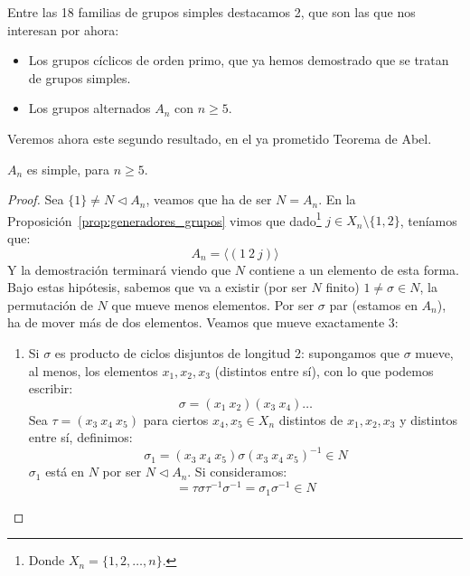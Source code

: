 \noindent
Entre las 18 familias de grupos simples destacamos 2, que son las que nos interesan por ahora: 
\begin{itemize}
    \item Los grupos cíclicos de orden primo, que ya hemos demostrado que se tratan de grupos simples.
    \item Los grupos alternados $A_n$ con $n\geq 5$.
\end{itemize}
Veremos ahora este segundo resultado, en el ya prometido Teorema de Abel.

\begin{teo}[de Abel]
    $A_n$ es simple, para $n\geq 5$.
    \begin{proof} 
        Sea $\{1\} \neq N \lhd A_n$, veamos que ha de ser $N = A_n$. En la Proposición~\ref{prop:generadores_grupos} vimos que dado\footnote{Donde $X_n = \{1,2,\ldots,n\}.$} $j \in X_n\setminus \{1,2\}$, teníamos que:
        \begin{equation*}
            A_n = \langle (1\ 2\ j) \rangle 
        \end{equation*}
        Y la demostración terminará viendo que $N$ contiene a un elemento de esta forma. Bajo estas hipótesis, sabemos que va a existir (por ser $N$ finito) $1\neq \sigma\in N$, la permutación de $N$ que mueve menos elementos. Por ser $\sigma$ par (estamos en $A_n$), ha de mover más de dos elementos. Veamos que mueve exactamente 3:
        \begin{enumerate}
            \item Si $\sigma$ es producto de ciclos disjuntos de longitud 2: supongamos que $\sigma$ mueve, al menos, los elementos $x_1,x_2,x_3$ (distintos entre sí), con lo que podemos escribir:
                \begin{equation*}
                    \sigma = (x_1\ x_2)(x_3\ x_4) \ldots
                \end{equation*}
                Sea $\tau = (x_3\ x_4\ x_5)$ para ciertos $x_4,x_5\in X_n$ distintos de $x_1,x_2,x_3$ y distintos entre sí, definimos:
                \begin{equation*}
                    \sigma_1 = (x_3\ x_4\ x_5)\sigma {(x_3\ x_4\ x_5)}^{-1}\in  N
                \end{equation*}
                $\sigma_1$ está en $N$ por ser $N\lhd A_n$. Si consideramos:
                \begin{equation*}
                    [\tau, \sigma] = \tau \sigma \tau^{-1} \sigma^{-1} = \sigma_1 \sigma^{-1} \in N
                \end{equation*}

\end{enumerate}
\end{proof}
\end{teo}
